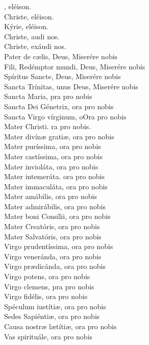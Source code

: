 \documentclass[9pt]{article}
\begin{document}
\begin{multicols*}{2}
    , eléison.\\
    Christe, eléison.\\
    Kýrie, eléison.\\
    Christe, audi nos.\\
    Christe, exáudi nos.\\
    Pater de cælis, Deus, Miserére nobis\\
    Fili, Redémptor mundi, Deus, Miserére nobis\\
    Spíritus Sancte, Deus, Miserére nobis\\
    Sancta Trínitas, unus Deus, Miserére nobis\\
    Sancta Maria, pra pro nobis\\
    Sancta Dei Génetrix, ora pro nobis\\
    Sancta Virgo vírginum, oOra pro nobis\\
    Mater Christi. ra pro nobis.\\
    Mater divín{\ae} gratiæ, ora pro nobis\\
    Mater puríssima, ora pro nobis\\
    Mater castíssima, ora pro nobis\\
    Mater invioláta, ora pro nobis\\
    Mater intemeráta. ora pro nobis\\
    Mater immaculáta, ora pro nobis\\
    Mater amábilis, ora pro nobis\\
    Mater admirábilis, ora pro nobis\\
    Mater boni Consílii, ora pro nobis\\
    Mater Creatóris, ora pro nobis\\
    Mater Salvatóris, ora pro nobis\\
    Virgo prudentíssima, ora pro nobis\\
    Virgo veneránda, ora pro nobis\\
    Virgo pr{\ae}dicánda, ora pro nobis\\
    Virgo potens, ora pro nobis\\
    Virgo clemens, pra pro nobis\\
    Virgo fidélis, ora pro nobis\\
    Spéculum iustítiæ, ora pro nobis\\
    Sedes Sapiéntiæ, ora pro nobis\\
    Causa nostræ l{\ae}títiæ, ora pro nobis\\
    Vas spirituále, ora pro nobis\\

\end{multicols*}
\end{document}
